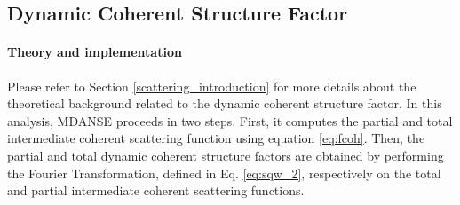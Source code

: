 \documentclass[a4paper,11pt]{article}
\begin{document}
\subsection{Dynamic Coherent Structure Factor}
\label{dcsf}
\paragraph{Theory and implementation\\}
\label{dcsf_theory}
Please refer to Section \ref{scattering_introduction} for more details about the theoretical background related to the dynamic
coherent structure factor. In this analysis, \gls{MDANSE} proceeds in two steps. First, it computes the partial and total
intermediate coherent scattering function using equation \ref{eq:fcoh}. Then, the partial and total dynamic coherent
structure factors are obtained by performing the Fourier Transformation, defined in Eq. \ref{eq:sqw_2}, respectively on
the total and partial intermediate coherent scattering functions.
\end{document}
